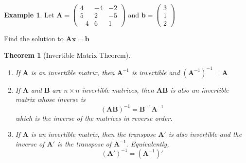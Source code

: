 \documentclass[
]{book}
\newtheorem{theorem}{Theorem}[chapter]
\theoremstyle{definition}
\theoremstyle{definition}
\newtheorem{example}{Example}[chapter]
\theoremstyle{definition}
\theoremstyle{definition}
\theoremstyle{remark}
\begin{document}
\begin{example}
Let \(\mathbf{A} = \begin{pmatrix} 4 & -4 & -2 \\ 5 & 2 & -5 \\ -4 & 6 & 1 \end{pmatrix}\) and \(\mathbf{b} = \begin{pmatrix} 3 \\ 1 \\ 2 \end{pmatrix}\)

Find the solution to \(\mathbf{A} \mathbf{x} = \mathbf{b}\)
\end{example}

\begin{theorem}[Invertible Matrix Theorem]
\protect\hypertarget{thm:invertible-matrix1}{}\label{thm:invertible-matrix1}

\begin{enumerate}
\def\labelenumi{\arabic{enumi})}
\item
  If \(\mathbf{A}\) is an invertible matrix, then \(\mathbf{A}^{-1}\) is invertible and \((\mathbf{A}^{-1})^{-1} = \mathbf{A}\)
\item
  If \(\mathbf{A}\) and \(\mathbf{B}\) are \(n \times n\) invertible matrices, then \(\mathbf{A} \mathbf{B}\) is also an invertible matrix whose inverse is
  \[
  (\mathbf{A}\mathbf{B})^{-1} = \mathbf{B}^{-1}\mathbf{A}^{-1}
  \]
  which is the inverse of the matrices in reverse order.
\item
  If \(\mathbf{A}\) is an invertible matrix, then the transpose \(\mathbf{A}'\) is also invertible and the inverse of \(\mathbf{A}'\) is the transpose of \(\mathbf{A}^{-1}\). Equivalently,
  \[
  (\mathbf{A}')^{-1} = (\mathbf{A}^{-1})'
  \]
\end{enumerate}

\end{theorem}
\end{document}
